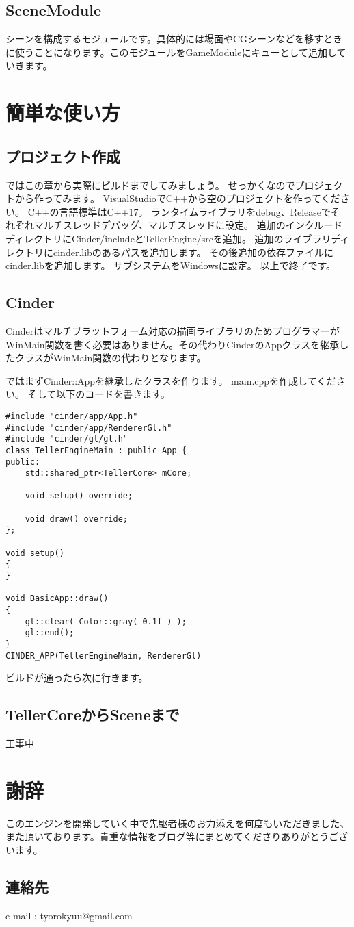 \documentclass[12pt,a4paper,uplatex,dvipdfmx]{jsarticle}
\begin{document}
\subsection{SceneModule}
シーンを構成するモジュールです。具体的には場面やCGシーンなどを移すときに使うことになります。このモジュールをGameModuleにキューとして追加していきます。

\section{簡単な使い方}
\subsection{プロジェクト作成}
ではこの章から実際にビルドまでしてみましょう。
せっかくなのでプロジェクトから作ってみます。
VisualStudioでC++から空のプロジェクトを作ってください。
C++の言語標準はC++17。
ランタイムライブラリをdebug、Releaseでそれぞれマルチスレッドデバッグ、マルチスレッドに設定。
追加のインクルードディレクトリにCinder/includeとTellerEngine/srcを追加。
追加のライブラリディレクトリにcinder.libのあるパスを追加します。
その後追加の依存ファイルにcinder.libを追加します。
サブシステムをWindowsに設定。
以上で終了です。

\subsection{Cinder}
Cinderはマルチプラットフォーム対応の描画ライブラリのためプログラマーがWinMain関数を書く必要はありません。その代わりCinderのAppクラスを継承したクラスがWinMain関数の代わりとなります。

ではまずCinder::Appを継承したクラスを作ります。
main.cppを作成してください。
そして以下のコードを書きます。

\begin{lstlisting}[caption=hoge,label=fuga]
#include "cinder/app/App.h"
#include "cinder/app/RendererGl.h"
#include "cinder/gl/gl.h"
class TellerEngineMain : public App {
public:
	std::shared_ptr<TellerCore> mCore;

	void setup() override;

	void draw() override;
};

void setup()
{
}

void BasicApp::draw()
{
	gl::clear( Color::gray( 0.1f ) );
	gl::end();
}
CINDER_APP(TellerEngineMain, RendererGl)
\end{lstlisting}

ビルドが通ったら次に行きます。
\subsection{TellerCoreからSceneまで}

\Large{工事中}
\normalsize

\newpage
\appendix
\section*{謝辞}
このエンジンを開発していく中で先駆者様のお力添えを何度もいただきました、また頂いております。貴重な情報をブログ等にまとめてくださりありがとうございます。

\subsection*{連絡先}
e-mail : tyorokyuu@gmail.com
\end{document}
